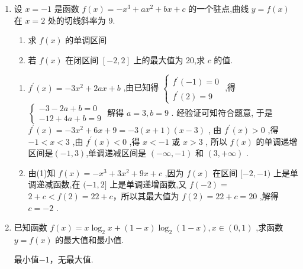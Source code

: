 \begin{enumerate}
    \item 设 $x =  - 1$ 是函数 $f\left( x\right)  =  - {x}^{3} + a{x}^{2} + {bx} + c$ 的一个驻点,曲线 $y = f\left( x\right)$ 在 $x = 2$ 处的切线斜率为 9.
    \begin{enumerate}
        \item 求 $f\left( x\right)$ 的单调区间
        \item 若 $f\left( x\right)$ 在闭区间 $\left\lbrack  {-2,2}\right\rbrack$ 上的最大值为 20,求 $c$ 的值.
    \end{enumerate}
    \begin{jieda}
        \begin{enumerate}
            \item ${f}^{\prime }\left( x\right)  =  - 3{x}^{2} + {2ax} + b$ ,由已知得 $\left\{  \begin{array}{l} {f}^{\prime }\left( {-1}\right)  = 0 \\  {f}^{\prime }\left( 2\right)  = 9 \end{array}\right.$ ,得 $\left\{  \begin{array}{l}  - 3 - {2a} + b = 0 \\   - {12} + {4a} + b = 9 \end{array}\right.$
            解得 $a = 3,b = 9$ . 经验证可知符合题意,
            于是 ${f}^{\prime }\left( x\right)  =  - 3{x}^{2} + {6x} + 9 =  - 3\left( {x + 1}\right) \left( {x - 3}\right)$ ,
            由 ${f}^{\prime }\left( x\right)  > 0$ ,得 $- 1 < x < 3$ ,由 ${f}^{\prime }\left( x\right)  < 0$ ,得 $x <  - 1$ 或 $x > 3$ ,
            所以 $f\left( x\right)$ 的单调递增区间是$(-1,3)$,单调递减区间是 $\left( {-\infty , - 1}\right)$ 和 $\left( {3, + \infty }\right)$ .
            \item 由(1)知 $f\left( x\right)  =  - {x}^{3} + {3{x}^{2}} + {9x} + c$ ,因为 $f\left( x\right)$ 在区间 $\lbrack  - 2, - 1)$ 上是单调递减函数,在 $( - 1,2\rbrack$ 上是单调递增函数,又 $f\left( {-2}\right)  =$
            $2 + c < f\left( 2\right)  = {22} + c$，所以其最大值为 $f\left( 2\right)  = {22} + c = {20}$ ,解得 $c =  - 2$ .
        \end{enumerate}
    \end{jieda}
    
    \item 已知函数 $f\left( x\right)  = x{\log }_{2}x + \left( {1 - x}\right) {\log }_{2}\left( {1 - x}\right) ,x \in  \left( {0,1}\right)$ ,求函数 $y = f\left( x\right)$ 的最大值和最小值.
    \begin{jieda}
        最小值$-1$，无最大值.
    \end{jieda}
    

\end{enumerate}
